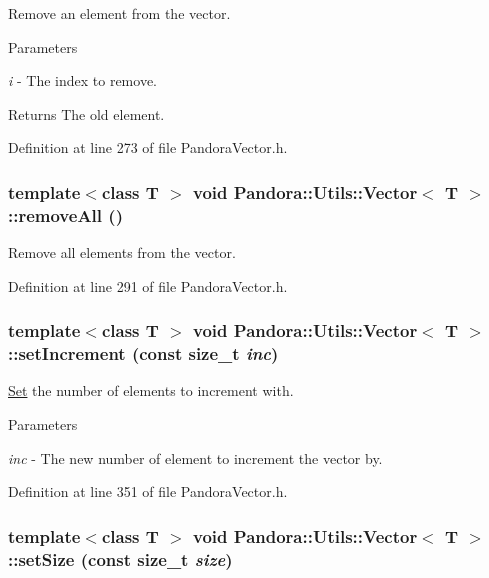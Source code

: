 Remove an element from the vector. 
\begin{DoxyParams}{Parameters}
\item[{\em i}]-\/ The index to remove. \end{DoxyParams}
\begin{DoxyReturn}{Returns}
The old element. 
\end{DoxyReturn}


Definition at line 273 of file PandoraVector.h.\hypertarget{classPandora_1_1Utils_1_1Vector_ab9f631b7ca468cba7f358ee14043b0a6}{
\subsubsection[{removeAll}]{\setlength{\rightskip}{0pt plus 5cm}template$<$class T $>$ void {\bf Pandora::Utils::Vector}$<$ T $>$::removeAll ()}}
\label{classPandora_1_1Utils_1_1Vector_ab9f631b7ca468cba7f358ee14043b0a6}


Remove all elements from the vector. 

Definition at line 291 of file PandoraVector.h.\hypertarget{classPandora_1_1Utils_1_1Vector_a7712e06b6660e77796a6d4093d949e8e}{
\subsubsection[{setIncrement}]{\setlength{\rightskip}{0pt plus 5cm}template$<$class T $>$ void {\bf Pandora::Utils::Vector}$<$ T $>$::setIncrement (const size\_\-t {\em inc})}}
\label{classPandora_1_1Utils_1_1Vector_a7712e06b6660e77796a6d4093d949e8e}


\hyperlink{classPandora_1_1Utils_1_1Set}{Set} the number of elements to increment with. 
\begin{DoxyParams}{Parameters}
\item[{\em inc}]-\/ The new number of element to increment the vector by. \end{DoxyParams}


Definition at line 351 of file PandoraVector.h.\hypertarget{classPandora_1_1Utils_1_1Vector_adc9658f8a19f67e7e92b43c5bd4206c7}{
\subsubsection[{setSize}]{\setlength{\rightskip}{0pt plus 5cm}template$<$class T $>$ void {\bf Pandora::Utils::Vector}$<$ T $>$::setSize (const size\_\-t {\em size})}}
\label{classPandora_1_1Utils_1_1Vector_adc9658f8a19f67e7e92b43c5bd4206c7}


